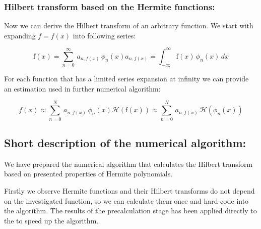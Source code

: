 \documentclass[12pt,twoside,a4paper]{article}
\numberwithin{equation}{subsection}
\numberwithin{figure}{subsection}
\begin{document}
\subsubsection*{Hilbert transform based on the Hermite functions:}

Now we can derive the Hilbert transform of an arbitrary function. We start with expanding $f = f(x)$ into following series:

\begin{subequations} \label{eq:hermite_fexpand}
  \begin{equation}   \label{eq:hfe_f}
     \mathrm{f}(x) = \sum_{n = 0}^{\infty } \, a_{n, f(x)} \, \phi_n(x) 
  \end{equation}
  \begin{equation}   \label{eq:hfe_an}
     a_{n, f(x)} = \int_{ - \infty }^{\infty } \mathrm{f}(x) \, \phi_n (x) \, dx
  \end{equation}
\end{subequations}

For each function that has a limited series expansion at infinity we can provide an estimation used in further numerical algorithm:

\begin{subequations} \label{eq:hermite_estimate}
  \begin{equation}   \label{eq:hest_fapprox}
      f(x) \approx \sum_{n = 0}^{N} \, a_{n, f(x)} \, \phi_n (x)
  \end{equation}
  \begin{equation}   \label{eq:hest_happrox}
     \mathcal{H} (\mathrm{f}(x)) \approx \sum_{n = 0} ^ {N} \, a_{n, f(x)} \, \mathcal{H}(\phi_n (x))
  \end{equation}
\end{subequations}

\subsection*{Short description of the numerical algorithm:}

We have prepared the numerical algorithm that calculates the Hilbert transform based on presented properties of Hermite polynomials. 

Firstly we observe Hermite functions and their Hilbert transforms do not depend on the investigated function, so we can calculate them once
and hard-code into the algorithm. The results of the precalculation stage has been applied directly to the to speed up the algorithm.
\end{document}
